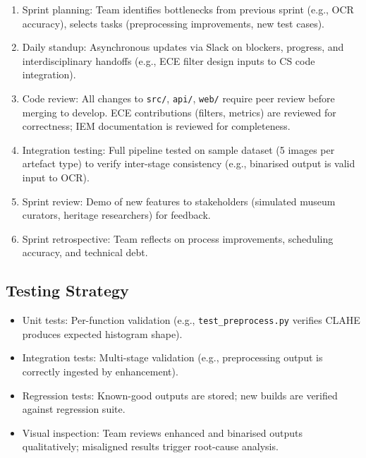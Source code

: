 \begin{enumerate}
	\item Sprint planning: Team identifies bottlenecks from previous sprint (e.g., OCR accuracy), selects tasks (preprocessing improvements, new test cases).
	
	\item Daily standup: Asynchronous updates via Slack on blockers, progress, and interdisciplinary handoffs (e.g., ECE filter design inputs to CS code integration).
	
	\item Code review: All changes to \texttt{src/}, \texttt{api/}, \texttt{web/} require peer review before merging to develop. ECE contributions (filters, metrics) are reviewed for correctness; IEM documentation is reviewed for completeness.
	
	\item Integration testing: Full pipeline tested on sample dataset (5 images per artefact type) to verify inter-stage consistency (e.g., binarised output is valid input to OCR).
	
	\item Sprint review: Demo of new features to stakeholders (simulated museum curators, heritage researchers) for feedback.
	
	\item Sprint retrospective: Team reflects on process improvements, scheduling accuracy, and technical debt.
\end{enumerate}

\subsection{Testing Strategy}

\begin{itemize}
	\item Unit tests: Per-function validation (e.g., \texttt{test\_preprocess.py} verifies CLAHE produces expected histogram shape).
	\item Integration tests: Multi-stage validation (e.g., preprocessing output is correctly ingested by enhancement).
	\item Regression tests: Known-good outputs are stored; new builds are verified against regression suite.
	\item Visual inspection: Team reviews enhanced and binarised outputs qualitatively; misaligned results trigger root-cause analysis.
\end{itemize}

